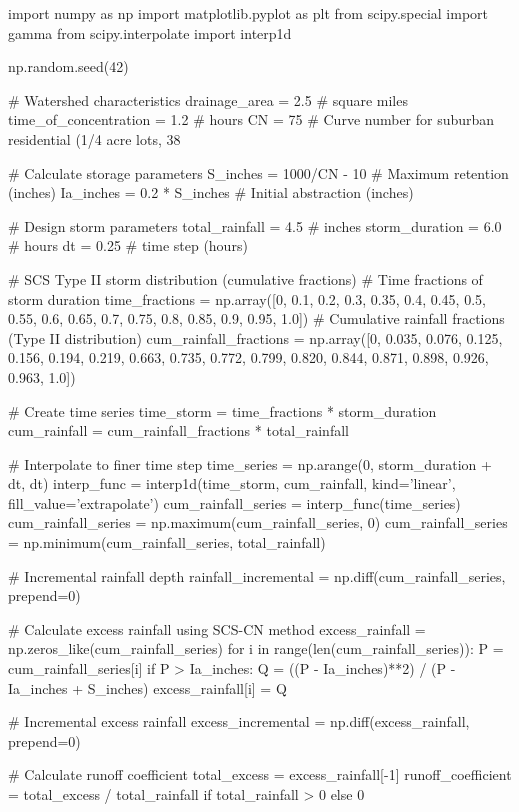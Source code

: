 \documentclass[a4paper, 11pt]{article}
\begin{document}
\begin{pycode}
import numpy as np
import matplotlib.pyplot as plt
from scipy.special import gamma
from scipy.interpolate import interp1d

np.random.seed(42)

# Watershed characteristics
drainage_area = 2.5  # square miles
time_of_concentration = 1.2  # hours
CN = 75  # Curve number for suburban residential (1/4 acre lots, 38%

# Calculate storage parameters
S_inches = 1000/CN - 10  # Maximum retention (inches)
Ia_inches = 0.2 * S_inches  # Initial abstraction (inches)

# Design storm parameters
total_rainfall = 4.5  # inches
storm_duration = 6.0  # hours
dt = 0.25  # time step (hours)

# SCS Type II storm distribution (cumulative fractions)
# Time fractions of storm duration
time_fractions = np.array([0, 0.1, 0.2, 0.3, 0.35, 0.4, 0.45, 0.5, 0.55, 0.6,
                           0.65, 0.7, 0.75, 0.8, 0.85, 0.9, 0.95, 1.0])
# Cumulative rainfall fractions (Type II distribution)
cum_rainfall_fractions = np.array([0, 0.035, 0.076, 0.125, 0.156, 0.194, 0.219,
                                   0.663, 0.735, 0.772, 0.799, 0.820, 0.844,
                                   0.871, 0.898, 0.926, 0.963, 1.0])

# Create time series
time_storm = time_fractions * storm_duration
cum_rainfall = cum_rainfall_fractions * total_rainfall

# Interpolate to finer time step
time_series = np.arange(0, storm_duration + dt, dt)
interp_func = interp1d(time_storm, cum_rainfall, kind='linear', fill_value='extrapolate')
cum_rainfall_series = interp_func(time_series)
cum_rainfall_series = np.maximum(cum_rainfall_series, 0)
cum_rainfall_series = np.minimum(cum_rainfall_series, total_rainfall)

# Incremental rainfall depth
rainfall_incremental = np.diff(cum_rainfall_series, prepend=0)

# Calculate excess rainfall using SCS-CN method
excess_rainfall = np.zeros_like(cum_rainfall_series)
for i in range(len(cum_rainfall_series)):
    P = cum_rainfall_series[i]
    if P > Ia_inches:
        Q = ((P - Ia_inches)**2) / (P - Ia_inches + S_inches)
        excess_rainfall[i] = Q

# Incremental excess rainfall
excess_incremental = np.diff(excess_rainfall, prepend=0)

# Calculate runoff coefficient
total_excess = excess_rainfall[-1]
runoff_coefficient = total_excess / total_rainfall if total_rainfall > 0 else 0


\end{pycode}
\end{document}
